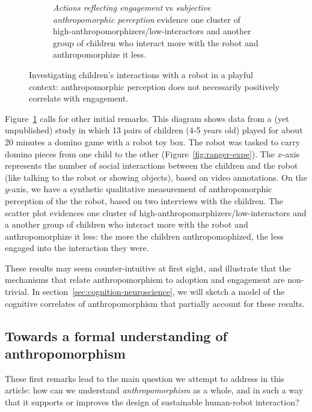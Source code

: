 \documentclass{frontiersSCNS} %
\begin{document}
\begin{figure}[b]
\begin{subfigure}[b]{0.48\columnwidth}
            \caption{\emph{Actions reflecting engagement} vs \textit{subjective anthropomorphic
                perception} evidence one cluster of
                high-anthropomorphizers/low-interactors and another group of children who
                interact more with the robot and anthropomorphize it less.}
            \label{fig:qualitative-score}
        \end{subfigure}
        \caption{Investigating children's interactions with a robot in a playful
            context: anthropomorphic perception does not necessarily positively
            correlate with engagement.}
    \label{fig:ranger}
\end{figure}


Figure~\ref{fig:qualitative-score} calls for other initial remarks. This diagram
shows data from a (yet unpublished) study in which 13 pairs of children (4-5
years old) played for about 20 minutes a domino game with a robot toy box. The
robot was tasked to carry domino pieces from one child to the other
(Figure~\ref{fig:ranger-expe}).  The $x$-axis represents the number of social
interactions between the children and the robot (like talking to the robot or
showing objects), based on video annotations. On the $y$-axis, we have a
synthetic qualitative measurement of anthropomorphic perception of the the
robot, based on two interviews with the children. The scatter plot evidences one
cluster of high-anthropomorphizers/low-interactors and a another group of
children who interact more with the robot and anthropomorphize it less: the more
the children anthropomophized, the less engaged into the interaction they were.

These results may seem counter-intuitive at first sight, and illustrate that the
mechanisms that relate anthropomorphism to adoption and engagement are
non-trivial. In section~\ref{sec:cognition-neuroscience}, we will sketch a model of
the cognitive correlates of anthropomorphism that partially account for these
results.


\subsection{Towards a formal understanding of anthropomorphism}

These first remarks lead to the main question we attempt to address in this
article: how can we understand \emph{anthropomorphism} as a whole, and in such a
way that it supports or improves the design of sustainable human-robot interaction?
\end{document}

